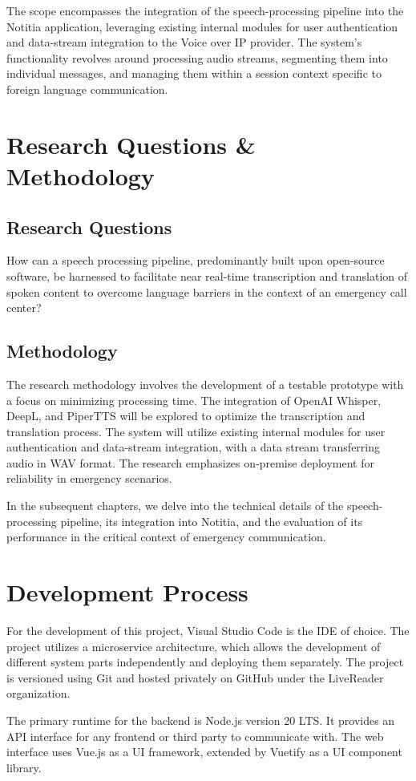 The scope encompasses the integration of the speech-processing pipeline into the Notitia application, leveraging 
existing internal modules for user authentication and data-stream integration to the Voice over IP provider. The 
system's functionality revolves around processing audio streams, segmenting them into individual messages, and managing 
them within a session context specific to foreign language communication.


\section{Research Questions \& Methodology}

\subsection{Research Questions}

How can a speech processing pipeline, predominantly built upon open-source software, be harnessed to facilitate near 
real-time transcription and translation of spoken content to overcome language barriers in the context of an emergency 
call center?

\subsection{Methodology}

The research methodology involves the development of a testable prototype with a focus on minimizing processing time. 
The integration of OpenAI Whisper, DeepL, and PiperTTS will be explored to optimize the transcription and translation 
process. The system will utilize existing internal modules for user authentication and data-stream integration, with a 
data stream transferring audio in WAV format. The research emphasizes on-premise deployment for reliability in 
emergency scenarios.

In the subsequent chapters, we delve into the technical details of the speech-processing pipeline, its integration into 
Notitia, and the evaluation of its performance in the critical context of emergency communication.


\section{Development Process}

For the development of this project, Visual Studio Code is the IDE of choice. The project utilizes a microservice 
architecture, which allows the development of different system parts independently and deploying them separately. 
The project is versioned using Git and hosted privately on GitHub under the LiveReader organization. 

The primary runtime for the backend is Node.js version 20 LTS. It provides an API interface for any frontend or third 
party to communicate with.
The web interface uses Vue.js as a UI framework, extended by Vuetify as a UI component library.
